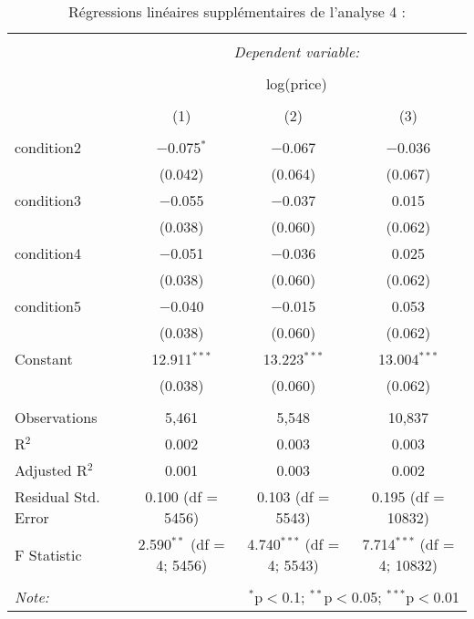 \documentclass[
  11pt,
  french,
]{article}
\begin{document}
\begin{table}[!htbp] \centering 
  \caption{Régressions linéaires supplémentaires de l'analyse 4 :} 
  \label{} 
\small 
\begin{tabular}{@{\extracolsep{1pt}}lccc} 
\\[-1.8ex]\hline 
\hline \\[-1.8ex] 
 & \multicolumn{3}{c}{\textit{Dependent variable:}} \\ 
\cline{2-4} 
\\[-1.8ex] & \multicolumn{3}{c}{log(price)} \\ 
\\[-1.8ex] & (1) & (2) & (3)\\ 
\hline \\[-1.8ex] 
 condition2 & $-$0.075$^{*}$ & $-$0.067 & $-$0.036 \\ 
  & (0.042) & (0.064) & (0.067) \\ 
  condition3 & $-$0.055 & $-$0.037 & 0.015 \\ 
  & (0.038) & (0.060) & (0.062) \\ 
  condition4 & $-$0.051 & $-$0.036 & 0.025 \\ 
  & (0.038) & (0.060) & (0.062) \\ 
  condition5 & $-$0.040 & $-$0.015 & 0.053 \\ 
  & (0.038) & (0.060) & (0.062) \\ 
  Constant & 12.911$^{***}$ & 13.223$^{***}$ & 13.004$^{***}$ \\ 
  & (0.038) & (0.060) & (0.062) \\ 
 \hline \\[-1.8ex] 
Observations & 5,461 & 5,548 & 10,837 \\ 
R$^{2}$ & 0.002 & 0.003 & 0.003 \\ 
Adjusted R$^{2}$ & 0.001 & 0.003 & 0.002 \\ 
Residual Std. Error & 0.100 (df = 5456) & 0.103 (df = 5543) & 0.195 (df = 10832) \\ 
F Statistic & 2.590$^{**}$ (df = 4; 5456) & 4.740$^{***}$ (df = 4; 5543) & 7.714$^{***}$ (df = 4; 10832) \\ 
\hline 
\hline \\[-1.8ex] 
\textit{Note:}  & \multicolumn{3}{r}{$^{*}$p$<$0.1; $^{**}$p$<$0.05; $^{***}$p$<$0.01} \\ 
\end{tabular} 
\end{table}
\end{document}
